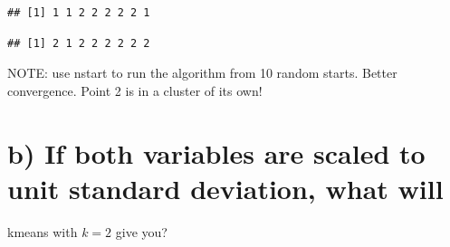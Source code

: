 \documentclass[]{article}
\newenvironment{Shaded}{\begin{snugshade}}{\end{snugshade}}
\newcommand{\DataTypeTok}[1]{\textcolor[rgb]{0.13,0.29,0.53}{#1}}
\newcommand{\DecValTok}[1]{\textcolor[rgb]{0.00,0.00,0.81}{#1}}
\newcommand{\FloatTok}[1]{\textcolor[rgb]{0.00,0.00,0.81}{#1}}
\newcommand{\KeywordTok}[1]{\textcolor[rgb]{0.13,0.29,0.53}{\textbf{#1}}}
\newcommand{\NormalTok}[1]{#1}
\newcommand{\OperatorTok}[1]{\textcolor[rgb]{0.81,0.36,0.00}{\textbf{#1}}}
\newcommand{\OtherTok}[1]{\textcolor[rgb]{0.56,0.35,0.01}{#1}}
\newcommand{\StringTok}[1]{\textcolor[rgb]{0.31,0.60,0.02}{#1}}
\begin{document}
\begin{Shaded}
\end{Shaded}

\begin{verbatim}
## [1] 1 1 2 2 2 2 2 1
\end{verbatim}

\begin{Shaded}
\end{Shaded}

\begin{verbatim}
## [1] 2 1 2 2 2 2 2 2
\end{verbatim}

NOTE: use nstart to run the algorithm from 10 random starts. Better
convergence. Point 2 is in a cluster of its own!

\hypertarget{b-if-both-variables-are-scaled-to-unit-standard-deviation-what-will}{%
\section{b) If both variables are scaled to unit standard deviation,
what
will}\label{b-if-both-variables-are-scaled-to-unit-standard-deviation-what-will}}

kmeans with \(k = 2\) give you?

\begin{Shaded}
\end{Shaded}
\end{document}
